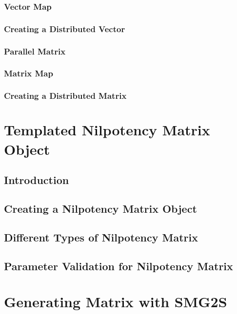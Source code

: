 \documentclass[letterpaper, 10 pt]{report}
\begin{document}
	\subsection{Vector Map}
	\subsection{Creating a Distributed Vector}
	
	\subsection{Parallel Matrix}
	\subsection{Matrix Map}
	\subsection{Creating a Distributed Matrix}
	
	\newpage
	\chapter{Templated  Nilpotency Matrix Object}
	\section{Introduction}
	\section{Creating a Nilpotency Matrix Object}
	\section{Different Types of Nilpotency Matrix}
	\section{Parameter Validation for Nilpotency Matrix}

	\newpage

	\chapter{Generating Matrix with SMG2S}
\end{document}
